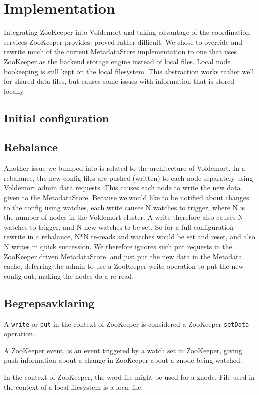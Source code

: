 
\section{Implementation}
Integrating ZooKeeper into Voldemort and taking advantage of the coordination services ZooKeeper provides, proved rather difficult.
We chose to override and rewrite much of the current MetadataStore implementation to one that uses ZooKeeper as the backend storage engine instead of local files. Local node bookeeping is still kept on the local filesystem.
This abstraction works rather well for shared data files, but causes some issues with information that is stored locally.

\subsection{Initial configuration}


\subsection{Rebalance}
Another issue we bumped into is related to the architecture of Voldemort.
In a rebalance, the new config files are pushed (written) to each node separately using Voldemort admin data requests. This causes each node to write the new data given to the MetadataStore.
Because we would like to be notified about changes to the config using watches, each write causes N watches to trigger, where N is the number of nodes in the Voldemort cluster.
A write therefore also causes N watches to trigger, and N new watches to be set. So for a full configuration rewrite in a rebalance, N*N re-reads and watches would be set and reset, and also N writes in quick succession.
We therefore ignores such put requests in the ZooKeeper driven MetadataStore, and just put the new data in the Metadata cache, deferring the admin to use a ZooKeeper write operation to put the new config out, making the nodes do a re-read.


\subsection{Begrepsavklaring}
A \texttt{write} or \texttt{put} in the context of ZooKeeper is considered a ZooKeeper \texttt{setData} operation.

A ZooKeeper event, is an event triggered by a watch set in ZooKeeper, giving push information about a change in ZooKeeper about a znode being watched.

In the context of ZooKeeper, the word file might be used for a znode. File used in the context of a local filesystem is a local file.


\clearpage


\clearpage



